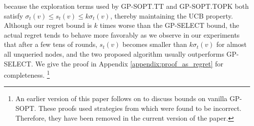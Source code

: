 because 
the exploration terms used by GP-SOPT.TT and GP-SOPT.TOPK both satisfy $\sigma_t(v) \leq s_t(v) \leq k \sigma_t(v)$,
thereby maintaining the UCB property. 
Although our regret bound is $k$ times worse than the GP-SELECT bound, the actual regret
tends to behave more favorably as we observe in our experiments that after a few tens of rounds, $s_t(v)$ becomes smaller than 
$k \sigma_t(v)$ for almost all unqueried nodes, and the two proposed algorithm usually outperforms GP-SELECT. 
We give the proof in Appendix \ref{appendix:proof_as_regret} for completeness.%
\footnote{An earlier version of this paper follows on to discuss bounds on vanilla GP-SOPT. These proofs used strategies from \cite{contal2014gaussian} which were found to be incorrect. Therefore, they have been removed in the current version of the paper.}



